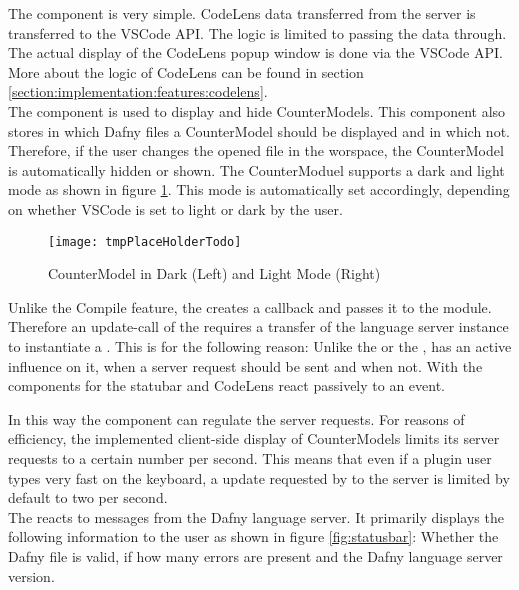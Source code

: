 The  component is very simple. CodeLens data transferred from the server is transferred to the VSCode API.
The logic is limited to passing the data through. The actual display of the CodeLens popup window is done via the
VSCode API. More about the logic of CodeLens can be found in section \ref{section:implementation:features:codelens}. \\

The  component is used to display and hide CounterModels.
This component also stores in which Dafny files a CounterModel should be displayed and in which not.
Therefore, if the user changes the opened file in the worspace, the CounterModel is automatically hidden or shown.
The CounterModuel supports a dark and light mode as shown in figure \ref{fig:dark_light_mode}.
This mode is automatically set accordingly,
depending on whether VSCode is set to light or dark by the user.

\begin{figure}[H]
    \centering
    \texttt{[image: tmpPlaceHolderTodo]}
    \caption{CounterModel in Dark (Left) and Light Mode (Right)}
    \label{fig:dark_light_mode}
\end{figure}

Unlike the Compile feature, the  creates a callback and passes it to the  module.
Therefore an update-call of the  requires a transfer of the language server instance to instantiate a .
This is for the following reason: Unlike the  or the ,
 has an active influence on it,
when a server request should be sent and when not.
With the components for the statubar and CodeLens react passively to an event.

In this way the  component can regulate the server requests.
For reasons of efficiency, the implemented client-side display of CounterModels limits its
server requests to a certain number per second.
This means that even if a plugin user types very fast on the keyboard, a
update requested by  to the server is limited by default to two per second. \\

The  reacts to messages from the Dafny language server.
It primarily displays the following information to the user as shown in figure \ref{fig:statusbar}:
Whether the Dafny file is valid, if how many errors are present and the Dafny language server version.

